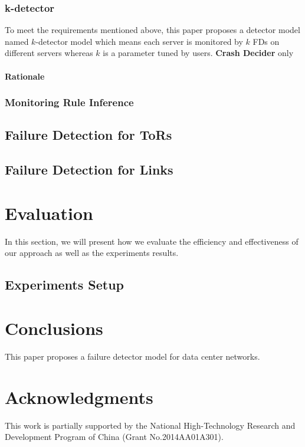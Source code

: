 \documentclass{sig-alternate-05-2015}
\begin{document}
\subsubsection{k-detector}
To meet the requirements mentioned above, this paper proposes a detector model named $k$-detector model which means each server is monitored by $k$ FDs on different servers whereas $k$ is a parameter tuned by users. \textbf{Crash Decider} only

\paragraph{Rationale}


\subsubsection{Monitoring Rule Inference}




\subsection{Failure Detection for ToRs}





\subsection{Failure Detection for Links}




\section{Evaluation}
In this section, we will present how we evaluate the efficiency and effectiveness of our approach as well as the experiments results.

\subsection{Experiments Setup}

\section{Conclusions}
This paper proposes a failure detector model for data center networks.


\section{Acknowledgments}
This work is partially supported by the National High-Technology Research and Development Program of China (Grant No.2014AA01A301).
\end{document}
